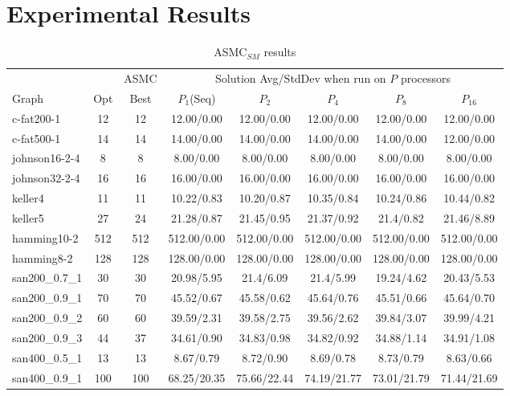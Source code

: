 \documentclass[11pt]{article}
\begin{document}
\section{Experimental Results}\label{results}

\linespread{1}
\begin{table*}[ht!]
\caption{ASMC$_{SM}$ results}\label{tab:spar_table}
\begin{footnotesize}
\begin{center}
\begin{tabular}{|l||c|c||c|c|c|c|c|}
\hline%
&&ASMC& \multicolumn{5}{|c|}{Solution Avg/StdDev when run on $P$ processors}\\
\cline{4-8}
Graph &Opt & Best      &$P_1$(Seq)  &$P_2$ &$P_4$   &$P_8$    &$P_{16}$\\
\hline											            				       
c-fat200-1 	&12 &12	   &12.00/0.00 &12.00/0.00 &12.00/0.00 &12.00/0.00 &12.00/0.00\\
c-fat500-1 	&14 &14	   &14.00/0.00 &14.00/0.00 &14.00/0.00 &14.00/0.00 &12.00/0.00\\
johnson16-2-4 	&8 	&8 	   &8.00/0.00 &8.00/0.00 &8.00/0.00 &8.00/0.00 &8.00/0.00\\
johnson32-2-4 	&16 &16    &16.00/0.00 &16.00/0.00 &16.00/0.00 &16.00/0.00 &16.00/0.00\\
\hline 
keller4 &11 &11 	&10.22/0.83 &10.20/0.87 &10.35/0.84 &10.24/0.86 &10.44/0.82\\
keller5 &27 &24     &21.28/0.87 &21.45/0.95 &21.37/0.92 &21.4/0.82 &21.46/8.89\\
hamming10-2 &512 &512 &512.00/0.00 &512.00/0.00 &512.00/0.00 &512.00/0.00 &512.00/0.00\\
hamming8-2 	&128 &128 &128.00/0.00 &128.00/0.00 &128.00/0.00 &128.00/0.00 &128.00/0.00\\
\hline
san200\_0.7\_1 	&30 &30 &20.98/5.95 &21.4/6.09 &21.4/5.99 &19.24/4.62 &20.43/5.53\\
san200\_0.9\_1 	&70 &70 &45.52/0.67 &45.58/0.62 &45.64/0.76 &45.51/0.66 &45.64/0.70\\
san200\_0.9\_2 	&60 &60 &39.59/2.31 &39.58/2.75 &39.56/2.62 &39.84/3.07 &39.99/4.21\\
san200\_0.9\_3 	&44 &37 &34.61/0.90 &34.83/0.98 &34.82/0.92 &34.88/1.14 &34.91/1.08\\
san400\_0.5\_1 	&13 &13 &8.67/0.79 &8.72/0.90 &8.69/0.78 &8.73/0.79 &8.63/0.66\\
san400\_0.9\_1 	&100 &100 &68.25/20.35 &75.66/22.44 &74.19/21.77 &73.01/21.79 &71.44/21.69\\

\end{tabular}
\end{center}
\end{footnotesize}
\end{table*}
\end{document}
